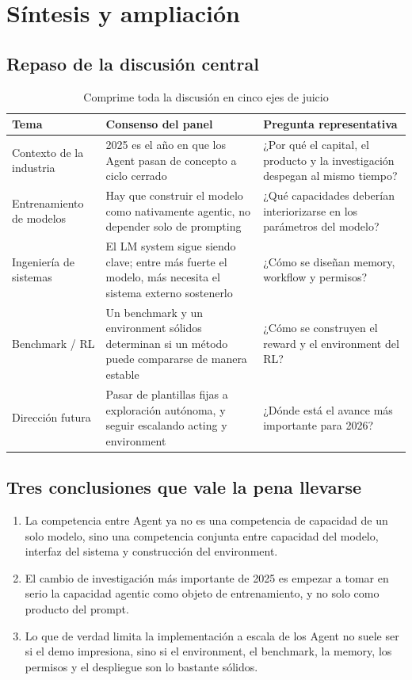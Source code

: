\section{Síntesis y ampliación}

\subsection{Repaso de la discusión central}
\begin{table}[H]
\centering
\begin{tabular}{p{2.8cm}p{4.0cm}p{5.0cm}}
\toprule
\textbf{Tema} & \textbf{Consenso del panel} & \textbf{Pregunta representativa} \\
\midrule
Contexto de la industria & 2025 es el año en que los Agent pasan de concepto a ciclo cerrado & ¿Por qué el capital, el producto y la investigación despegan al mismo tiempo? \\
Entrenamiento de modelos & Hay que construir el modelo como nativamente agentic, no depender solo de prompting & ¿Qué capacidades deberían interiorizarse en los parámetros del modelo? \\
Ingeniería de sistemas & El LM system sigue siendo clave; entre más fuerte el modelo, más necesita el sistema externo sostenerlo & ¿Cómo se diseñan memory, workflow y permisos? \\
Benchmark / RL & Un benchmark y un environment sólidos determinan si un método puede compararse de manera estable & ¿Cómo se construyen el reward y el environment del RL? \\
Dirección futura & Pasar de plantillas fijas a exploración autónoma, y seguir escalando acting y environment & ¿Dónde está el avance más importante para 2026? \\
\bottomrule
\end{tabular}
\caption{Comprime toda la discusión en cinco ejes de juicio}
\end{table}

\subsection{Tres conclusiones que vale la pena llevarse}
\begin{enumerate}
  \item La competencia entre Agent ya no es una competencia de capacidad de un solo modelo, sino una competencia conjunta entre capacidad del modelo, interfaz del sistema y construcción del environment.
  \item El cambio de investigación más importante de 2025 es empezar a tomar en serio la capacidad agentic como objeto de entrenamiento, y no solo como producto del prompt.
  \item Lo que de verdad limita la implementación a escala de los Agent no suele ser si el demo impresiona, sino si el environment, el benchmark, la memory, los permisos y el despliegue son lo bastante sólidos.
\end{enumerate}

